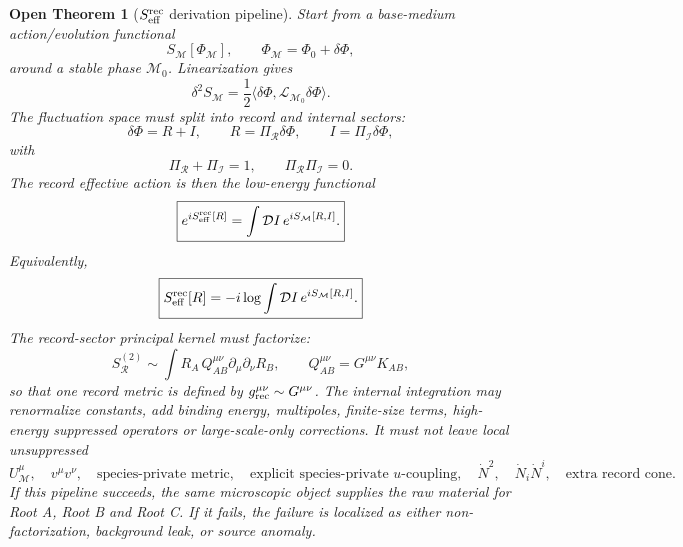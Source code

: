 \documentclass[11pt]{article}
\newtheorem{openthm}{Open Theorem}
\begin{document}
\begin{openthm}[\(S_{\rm eff}^{\rm rec}\) derivation pipeline]
Start from a base-medium action/evolution functional
\[
\boxed{
S_{\mathcal M}[\Phi_{\mathcal M}],
\qquad
\Phi_{\mathcal M}=\Phi_0+\delta\Phi,
}
\]
around a stable phase \(\mathcal M_0\).  Linearization gives
\[
\boxed{
\delta^2S_{\mathcal M}
=
\frac12
\langle\delta\Phi,\mathcal L_{\mathcal M_0}\delta\Phi\rangle.
}
\]
The fluctuation space must split into record and internal sectors:
\[
\boxed{
\delta\Phi=R+I,
\qquad
R=\Pi_{\mathcal R}\delta\Phi,
\qquad
I=\Pi_{\mathcal I}\delta\Phi,
}
\]
with
\[
\boxed{
\Pi_{\mathcal R}+\Pi_{\mathcal I}=1,
\qquad
\Pi_{\mathcal R}\Pi_{\mathcal I}=0.
}
\]
The record effective action is then the low-energy functional
\[
\boxed{
e^{iS_{\rm eff}^{\rm rec}[R]}
=
\int{\cal D}I\,e^{iS_{\mathcal M}[R,I]}.
}
\]
Equivalently,
\[
\boxed{
S_{\rm eff}^{\rm rec}[R]
=
-i\log\int{\cal D}I\,e^{iS_{\mathcal M}[R,I]}.
}
\]
The record-sector principal kernel must factorize:
\[
\boxed{
S_{\mathcal R}^{(2)}
\sim
\int R_A\,Q_{AB}^{\mu\nu}\partial_\mu\partial_\nu R_B,
\qquad
Q_{AB}^{\mu\nu}=G^{\mu\nu}K_{AB},
}
\]
so that one record metric is defined by \(g_{\rm rec}^{\mu\nu}\sim
G^{\mu\nu}\).  The internal integration may renormalize constants, add binding
energy, multipoles, finite-size terms, high-energy suppressed operators or
large-scale-only corrections.  It must not leave local unsuppressed
\[
\boxed{
U^\mu_{\mathcal M},\quad
v^\mu v^\nu,\quad
\text{species-private metric},\quad
\text{explicit species-private }u\text{-coupling},\quad
\dot N^2,\quad
\dot N_i\dot N^i,\quad
\text{extra record cone}.
}
\]
If this pipeline succeeds, the same microscopic object supplies the raw
material for Root A, Root B and Root C.  If it fails, the failure is localized
as either non-factorization, background leak, or source anomaly.
\end{openthm}
\end{document}
